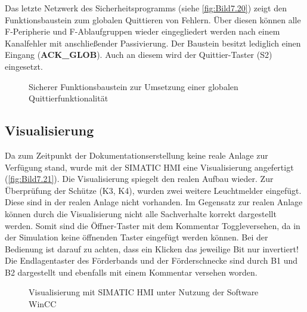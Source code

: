 Das letzte Netzwerk des Sicherheitsprogramms (siehe \autoref{fig:Bild7.20}) zeigt den Funktionsbaustein zum globalen Quittieren von Fehlern. Über diesen können alle F-Peripherie und F-Ablaufgruppen wieder eingegliedert werden nach \zB einem Kanalfehler mit anschließender Passivierung. Der Baustein besitzt lediglich einen Eingang (\textbf{ACK\_GLOB}). Auch an diesem wird der Quittier-Taster (S2) eingesetzt.

\begin{figure}[H]
   \centering
   \caption[FB zum globalen Quittieren]{Sicherer Funktionsbaustein zur Umsetzung einer globalen Quittierfunktionalität}
   \label{fig:Bild7.20}
\end{figure}

\clearpage

\subsection{Visualisierung}

Da zum Zeitpunkt der Dokumentationserstellung keine reale Anlage zur Verfügung stand, wurde mit der SIMATIC HMI eine Visualisierung angefertigt (\autoref{fig:Bild7.21}). Die Visualisierung spiegelt den realen Aufbau wieder. Zur Überprüfung der Schütze (K3, K4), wurden zwei weitere Leuchtmelder eingefügt. Diese sind in der realen Anlage nicht vorhanden. Im Gegensatz zur realen Anlage können durch die Visualisierung nicht alle Sachverhalte korrekt dargestellt werden. Somit sind die Öffner-Taster mit dem Kommentar \glqq Toggle\grqq\:versehen, da in der Simulation keine öffnenden Taster eingefügt werden können. Bei der Bedienung ist darauf zu achten, dass ein Klicken das jeweilige Bit nur invertiert! Die Endlagentaster des Förderbands und der Förderschnecke sind durch B1 und B2 dargestellt und ebenfalls mit einem Kommentar versehen worden. 

\begin{figure}[H]
   \centering
   \caption[Visualisierung mit SIMATIC HMI]{Visualisierung mit SIMATIC HMI unter Nutzung der Software WinCC}
   \label{fig:Bild7.21}
\end{figure}
